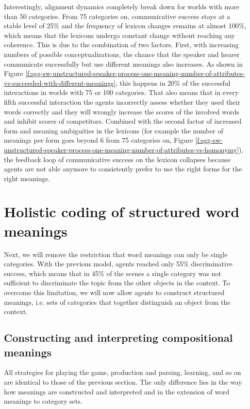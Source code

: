 Interestingly, alignment dynamics completely break down for worlds
with more than 50 categories. From 75 categories on, communicative
success stays at a stable level of 25\% and the frequency of lexicon
changes remains at almost 100\%, which means that the lexicons undergo
constant change without reaching any coherence. This is due to the
combination of two factors. First, with increasing numbers of possible
conceptualizations, the chance that the speaker and hearer communicate
successfully but use different meanings also increases. As shown in
Figure
\ref{f:sgg-sw-unstructured-speaker-process-one-meaning-number-of-attributes-vs-succeeded-with-different-meanings},
this happens in 20\% of the successful interactions in worlds with 75
or 100 categories. That also means that in every fifth successful
interaction the agents incorrectly assess whether they used their
words correctly and they will wrongly increase the scores of the
involved words and inhibit scores of competitors. Combined with the
second factor of increased form and meaning ambiguities in the
lexicons (for example the number of meanings per form goes beyond 6
from 75 categories on, Figure
\ref{f:sgg-sw-unstructured-speaker-process-one-meaning-number-of-attributes-vs-homonymy}),
the feedback loop of communicative success on the lexicon collapses
because agents are not able anymore to consistently prefer to use the
right forms for the right meanings.



\section{Holistic coding of structured word meanings}
\label{s:sgg-sw-structured}

Next, we will remove the restriction that word meanings can only be
single categories. With the previous model, agents reached only 55\%
discriminative success, which means that in 45\% of the scenes a
single category was not sufficient to discriminate the topic from the
other objects in the context. To overcome this limitation, we will now
allow agents to construct structured meanings, i.e. sets of categories
that together distinguish an object from the context.

\subsection{Constructing and interpreting compositional meanings}

All strategies for playing the game, production and parsing, learning,
and so on are identical to those of the previous section. The only
difference lies in the way how meanings are constructed and
interpreted and in the extension of word meanings to category sets.

